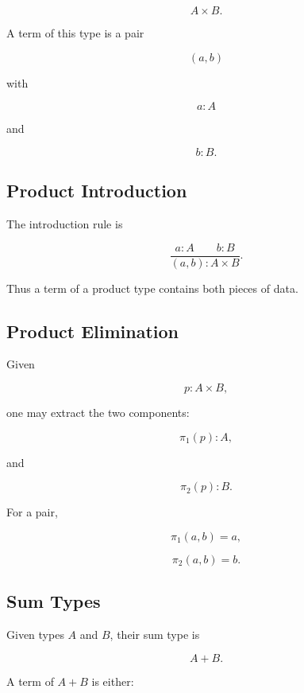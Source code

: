 \[
\boxed{
A\times B.
}
\]

A term of this type is a pair

\[
\boxed{
(a,b)
}
\]

with

\[
a:A
\]

and

\[
b:B.
\]

\subsection{Product Introduction}
\label{subsec:product-introduction}

The introduction rule is

\[
\boxed{
\frac{
a:A
\qquad
b:B
}{
(a,b):A\times B
}.
}
\]

Thus a term of a product type contains both pieces of data.

\subsection{Product Elimination}
\label{subsec:product-elimination}

Given

\[
p:A\times B,
\]

one may extract the two components:

\[
\boxed{
\pi_1(p):A,
}
\]

and

\[
\boxed{
\pi_2(p):B.
}
\]

For a pair,

\[
\boxed{
\pi_1(a,b)=a,
}
\]

\[
\boxed{
\pi_2(a,b)=b.
}
\]

\subsection{Sum Types}
\label{subsec:sum-types}

Given types \(A\) and \(B\), their sum type is

\[
\boxed{
A+B.
}
\]

A term of \(A+B\) is either:

